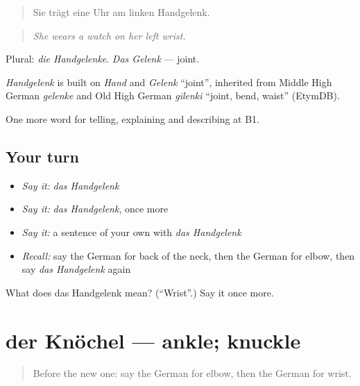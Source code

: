 \begin{quote}
Sie trägt eine Uhr am linken Handgelenk.
\end{quote}

\begin{quote}
\emph{She wears a watch on her left wrist.}
\end{quote}

Plural: \emph{die Handgelenke}. \emph{Das Gelenk} — joint.

\begin{cousinweb}
\emph{Handgelenk} is built on \emph{Hand} and \emph{Gelenk} \textquotedblleft{}joint\textquotedblright{}, inherited from Middle High German \emph{gelenke} and Old High German \emph{gilenki} \textquotedblleft{}joint, bend, waist\textquotedblright{} (EtymDB).
\end{cousinweb}

\begin{grammarlens}[title={What you've built}]
One more word for telling, explaining and describing at B1.
\end{grammarlens}

\subsection*{Your turn}
\begin{itemize}
\raggedright
  \item \emph{Say it:} \emph{das Handgelenk}
  \item \emph{Say it:} \emph{das Handgelenk}, once more
  \item \emph{Say it:} a sentence of your own with \emph{das Handgelenk}
  \item \emph{Recall:} say the German for back of the neck, then the German for elbow, then say \emph{das Handgelenk} again
\end{itemize}

\begin{tcolorbox}[breakable,colback=teal!4,colframe=teal!35!black,title={Before you move on}]
What does das Handgelenk mean? (\textquotedblleft{}Wrist\textquotedblright{}.) Say it once more.
\end{tcolorbox}
\section[der Knöchel]{der Knöchel — ankle; knuckle}

\label{lesson:GE-C485-knoechel}



\begin{quote}
Before the new one: say the German for elbow, then the German for wrist.
\end{quote}

